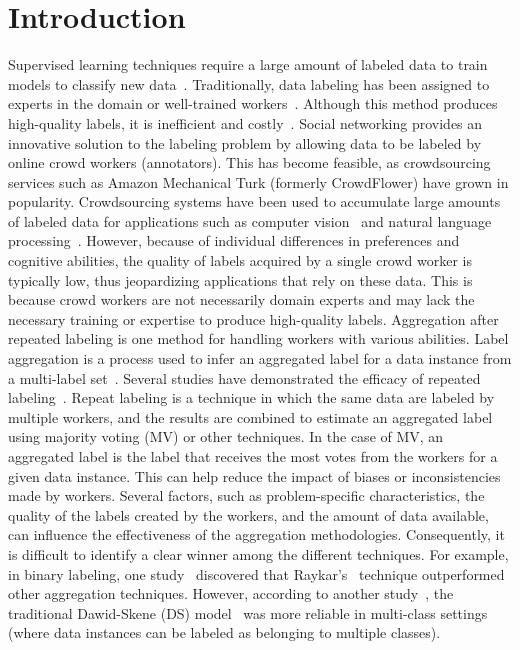 \documentclass[default]{bst/sn-jnl_mine}%
\begin{document}
\section{Introduction}
Supervised learning techniques require a large amount of labeled data to train models to classify new data~\cite{jiang_Wrapper_2019,jiang_Class_2019}. Traditionally, data labeling has been assigned to experts in the domain or well-trained workers~\cite{tian_MaxMargin_2019}. Although this method produces high-quality labels, it is inefficient and costly~\cite{li_Noise_2016,li_Noise_2019}.  Social networking provides an innovative solution to the labeling problem by allowing data to be labeled by online crowd workers (annotators). This has become feasible, as crowdsourcing services such as Amazon Mechanical Turk (formerly CrowdFlower) have grown in popularity. Crowdsourcing systems have been used to accumulate large amounts of labeled data for applications such as computer vision~\cite{deng_ImageNet_2009,liu_Variational_2012} and natural language processing~\cite{karger_Budget_2014}. However, because of individual differences in preferences and cognitive abilities, the quality of labels acquired by a single crowd worker is typically low, thus jeopardizing applications that rely on these data. This is because crowd workers are not necessarily domain experts and may lack the necessary training or expertise to produce high-quality labels.
Aggregation after repeated labeling is one method for handling workers with various abilities. Label aggregation is a process used to infer an aggregated label for a data instance from a multi-label set~\cite{sheshadri_SQUARE_2013}. Several studies have demonstrated the efficacy of repeated labeling~\cite{tu_MultiLabel_2018,zhang_multilabelinferencecrowdsourcing_2018}. Repeat labeling is a technique in which the same data are labeled by multiple workers, and the results are combined to estimate an aggregated label using majority voting (MV) or other techniques. In the case of MV, an aggregated label is the label that receives the most votes from the workers for a given data instance. This can help reduce the impact of biases or inconsistencies made by workers. Several factors, such as problem-specific characteristics, the quality of the labels created by the workers, and the amount of data available, can influence the effectiveness of the aggregation methodologies. Consequently, it is difficult to identify a clear winner among the different techniques. For example, in binary labeling, one study~\cite{sheshadri_SQUARE_2013} discovered that Raykar's~\cite{raykar_Learning_2010} technique outperformed other aggregation techniques. However, according to another study~\cite{zheng_Truth_2017}, the traditional Dawid-Skene (DS) model~\cite{dawid_Maximum_1979} was more reliable in multi-class settings (where data instances can be labeled as belonging to multiple classes).
\end{document}
